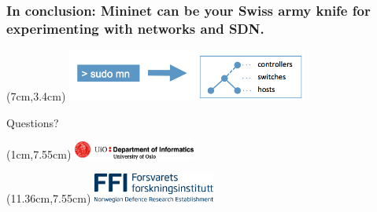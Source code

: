 \documentclass{beamer}
\begin{document}
\begin{frame}[plain]
  \frametitle{In conclusion: Mininet can be your Swiss army knife for
    experimenting with networks and SDN.}

  \begin{textblock*}{7.9cm} (7cm,3.4cm) %
    \includegraphics[width=7.9cm]{images/mininet.png}
    \captionsetup[figure]{justification=centering,font=footnotesize}
  \end{textblock*}

  \hspace{1cm}
  \large{Questions?}
  \begin{textblock*}{4cm} (1cm,7.55cm) %
    \includegraphics[width=4cm]{images/uio-ifi.png}
  \end{textblock*}

  \begin{textblock*}{4cm} (11.36cm,7.55cm) %
    \includegraphics[width=4cm]{images/ffi.png}
  \end{textblock*}

  \addtocounter{framenumber}{-1}
\end{frame}
\end{document}
